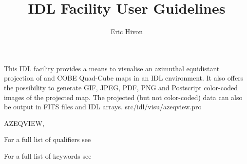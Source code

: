 




\sloppy



\title{\healpix IDL Facility User Guidelines}
 \section[azeqview]{ }
\label{idl:\thedocid}
\author{Eric Hivon}



\begin{facility}
{This IDL facility provides a means to visualise an azimuthal equidistant projection 
 of
\healpix and COBE Quad-Cube maps in an IDL environment. 
It also offers the possibility to
generate GIF, JPEG, PDF, PNG and Postscript color-coded images of the projected map.
The projected (but not color-coded) data can also be output in FITS files and
IDL arrays.}
{src/idl/visu/azeqview.pro}
\end{facility}

\begin{IDLformat}
{AZEQVIEW, 
\normalsize{
}
}
\end{IDLformat}

\begin{qualifiers}
  \begin{qulist}{} %
\item [{\  }] For a full list of qualifiers see 
  \end{qulist}
\end{qualifiers}

\begin{keywords}
  \begin{kwlist}{} %
\item [{\  }] For a full list of keywords see 
  \end{kwlist}
\end{keywords}

\renewcommand{\projfullname}{an azimuthal equidistant}
\begin{codedescription}
{}
\end{codedescription}

